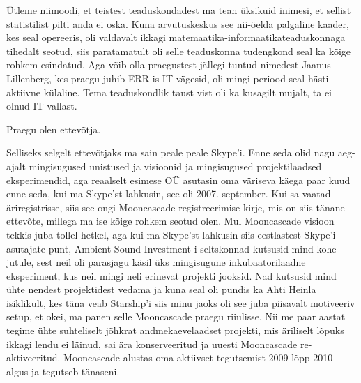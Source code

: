 
Ütleme niimoodi, et teistest teaduskondadest ma tean üksikuid inimesi, et sellist statistilist pilti anda ei oska. Kuna arvutuskeskus see nii-öelda palgaline kaader, kes seal opereeris, oli valdavalt ikkagi  matemaatika-informaatikateaduskonnaga tihedalt seotud, siis paratamatult oli selle teaduskonna tudengkond seal ka kõige rohkem esindatud. Aga võib-olla praegustest jällegi tuntud nimedest  Jaanus Lillenberg, kes praegu juhib ERR-is IT-vägesid, oli mingi periood seal hästi aktiivne külaline. Tema teaduskondlik taust vist oli ka kusagilt mujalt, ta ei olnud IT-vallast. 

Praegu olen ettevõtja. 


Selliseks selgelt ettevõtjaks ma sain peale peale Skype'i. Enne seda olid nagu aeg-ajalt  mingisugused unistused ja visioonid ja  mingisugused projektilaadsed eksperimendid, aga reaalselt esimese OÜ asutasin oma väriseva käega paar kuud enne seda, kui ma Skype'st lahkusin, see oli 2007. september. Kui sa vaatad äriregistrisse, siis see ongi Mooncascade registreerimise kirje, mis on siis tänane ettevõte, millega ma ise kõige rohkem seotud olen. Mul Mooncascade visioon tekkis juba tollel hetkel, aga kui ma  Skype'st lahkusin siis eestlastest Skype'i asutajate punt, Ambient Sound Investment-i seltskonnad kutsusid mind kohe jutule, sest  neil oli parasjagu käsil üks mingisugune inkubaatorilaadne eksperiment, kus neil mingi neli erinevat projekti jooksid. Nad kutsusid mind ühte nendest projektidest vedama ja kuna seal oli pundis ka Ahti Heinla isiklikult, kes täna veab Starship'i siis minu jaoks oli see juba piisavalt motiveeriv setup, et okei, ma panen selle Mooncascade praegu  riiulisse. Nii me paar aastat tegime ühte suhteliselt jõhkrat andmekaevelaadset projekti, mis äriliselt lõpuks ikkagi lendu ei läinud, sai ära konserveeritud ja  uuesti Mooncascade re-aktiveeritud.  Mooncascade alustas oma aktiivset tegutsemist 2009 lõpp 2010 algus ja tegutseb tänaseni. 
